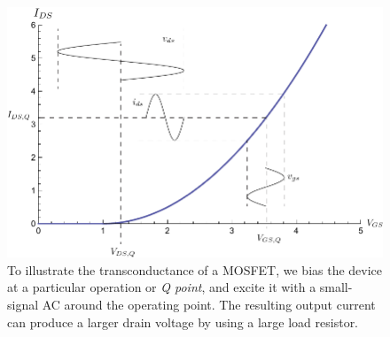 \begin{figure}[H]
\centering
\includegraphics[width=\columnwidth]{ids_vgs_vds}
\caption{To illustrate the transconductance of a MOSFET, we bias the device at a particular operation or \textit{Q point}, and excite it with a small-signal AC around the operating point.  The resulting output current can produce a larger drain voltage by using a large load resistor.}
\label{fig:ids_vgs_vds}
\end{figure}
\newpage
